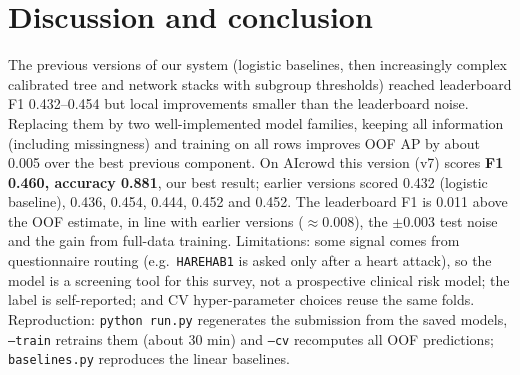 \documentclass[10pt,conference,compsocconf]{IEEEtran}
\begin{document}
\section{Discussion and conclusion}
The previous versions of our system (logistic baselines, then increasingly complex
calibrated tree and network stacks with subgroup thresholds) reached leaderboard F1
0.432--0.454 but local improvements smaller than the leaderboard noise. Replacing them by
two well-implemented model families, keeping all information (including missingness) and
training on all rows improves OOF AP by about 0.005 over the best previous component.
On AIcrowd this version (v7) scores \textbf{F1 0.460, accuracy 0.881}, our best result;
earlier versions scored 0.432 (logistic baseline), 0.436, 0.454, 0.444, 0.452 and 0.452.
The leaderboard F1 is 0.011 above the OOF estimate, in line with earlier versions
($\approx$0.008), the $\pm0.003$ test noise and the gain from full-data training.
Limitations: some signal comes from questionnaire routing (e.g.\ \texttt{HAREHAB1} is
asked only after a heart attack), so the model is a screening tool for this survey, not a
prospective clinical risk model; the label is self-reported; and CV hyper-parameter choices
reuse the same folds. Reproduction: \texttt{python run.py} regenerates the submission from
the saved models, \texttt{--train} retrains them (about 30 min) and \texttt{--cv}
recomputes all OOF predictions; \texttt{baselines.py} reproduces the linear baselines.
\end{document}
